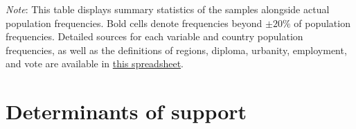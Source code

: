 \begin{table}[h!]
    \caption[Sample representativeness in JP, SA, US]{Sample representativeness in Japan, Saudi Arabia, the United States. %
    } \label{tab:representativeness_3}
    \makebox[\textwidth][c]{\resizebox*{!}{.80\textheight}{}}
    {\footnotesize \textit{Note}: This table displays summary statistics of the samples alongside actual population frequencies. Bold cells denote frequencies beyond $\pm 20\%$ of population frequencies. 
    Detailed sources for each variable and country population frequencies, as well as the definitions of regions, diploma, urbanity, employment, and vote are available in \href{https://github.com/bixiou/robustness_global_redistr/raw/main/questionnaire/sources.xlsx}{this spreadsheet}. 
    } 
\end{table}
\clearpage
\section{Determinants of support}\label{app:determinants}



